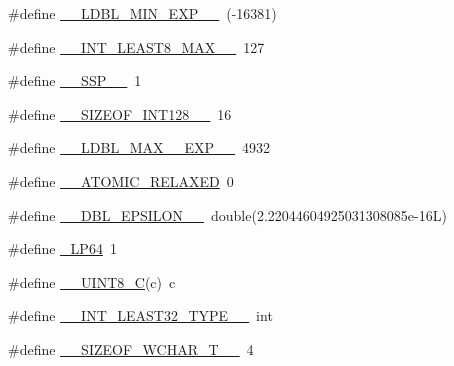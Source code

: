 \begin{DoxyCompactItemize}
\#define \hyperlink{build-analizer__host-_desktop___qt__5__9__0___g_c_c__64bit-_release_2moc__predefs_8h_ac3707c00cdbb574b68fd6263ac4d0407}{\+\_\+\+\_\+\+L\+D\+B\+L\+\_\+\+M\+I\+N\+\_\+\+E\+X\+P\+\_\+\+\_\+}~(-\/16381)
\item 
\#define \hyperlink{build-analizer__host-_desktop___qt__5__9__0___g_c_c__64bit-_release_2moc__predefs_8h_adc1ccadf1d98117e586324ccb189c09f}{\+\_\+\+\_\+\+I\+N\+T\+\_\+\+L\+E\+A\+S\+T8\+\_\+\+M\+A\+X\+\_\+\+\_\+}~127
\item 
\#define \hyperlink{build-analizer__host-_desktop___qt__5__9__0___g_c_c__64bit-_release_2moc__predefs_8h_a5bdc5761fa4dd6f2a284bd16f319009d}{\+\_\+\+\_\+\+S\+S\+P\+\_\+\+\_\+}~1
\item 
\#define \hyperlink{build-analizer__host-_desktop___qt__5__9__0___g_c_c__64bit-_release_2moc__predefs_8h_a1433791b35cde12c112c2ef54b61a4d2}{\+\_\+\+\_\+\+S\+I\+Z\+E\+O\+F\+\_\+\+I\+N\+T128\+\_\+\+\_\+}~16
\item 
\#define \hyperlink{build-analizer__host-_desktop___qt__5__9__0___g_c_c__64bit-_release_2moc__predefs_8h_afc6ac46966747a9423f4a6bb3af94b55}{\+\_\+\+\_\+\+L\+D\+B\+L\+\_\+\+M\+A\+X\+\_\+\_\+\+E\+X\+P\+\_\+\+\_\+}~4932
\item 
\#define \hyperlink{build-analizer__host-_desktop___qt__5__9__0___g_c_c__64bit-_release_2moc__predefs_8h_a8faf1f097f05558889df4c44d052d35e}{\+\_\+\+\_\+\+A\+T\+O\+M\+I\+C\+\_\+\+R\+E\+L\+A\+X\+E\+D}~0
\item 
\#define \hyperlink{build-analizer__host-_desktop___qt__5__9__0___g_c_c__64bit-_release_2moc__predefs_8h_a54983bc256dc296a42fe88b9be24f268}{\+\_\+\+\_\+\+D\+B\+L\+\_\+\+E\+P\+S\+I\+L\+O\+N\+\_\+\+\_\+}~double(2.\+22044604925031308085e-\/16\+L)
\item 
\#define \hyperlink{build-analizer__host-_desktop___qt__5__9__0___g_c_c__64bit-_release_2moc__predefs_8h_a02ee5c8ce8c3a0262b18d716cdeb2d1d}{\+\_\+\+L\+P64}~1
\item 
\#define \hyperlink{build-analizer__host-_desktop___qt__5__9__0___g_c_c__64bit-_release_2moc__predefs_8h_a23cc29e487b9acd9261adc6c71c1ff0e}{\+\_\+\+\_\+\+U\+I\+N\+T8\+\_\+\+C}(c)~c
\item 
\#define \hyperlink{build-analizer__host-_desktop___qt__5__9__0___g_c_c__64bit-_release_2moc__predefs_8h_a401f5f43b9e96d82152bf7cec0be6dfd}{\+\_\+\+\_\+\+I\+N\+T\+\_\+\+L\+E\+A\+S\+T32\+\_\+\+T\+Y\+P\+E\+\_\+\+\_\+}~int
\item 
\#define \hyperlink{build-analizer__host-_desktop___qt__5__9__0___g_c_c__64bit-_release_2moc__predefs_8h_a5cc6a3e1680136db2b5e60c2fb703d99}{\+\_\+\+\_\+\+S\+I\+Z\+E\+O\+F\+\_\+\+W\+C\+H\+A\+R\+\_\+\+T\+\_\+\+\_\+}~4

\end{DoxyCompactItemize}
